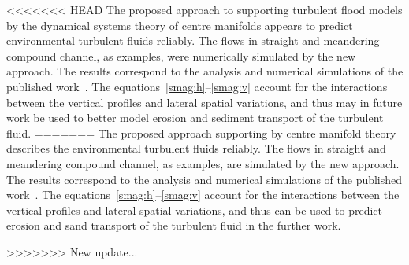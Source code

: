 \documentclass[twocolumn]{afmc_art}
\begin{document}
<<<<<<< HEAD
The proposed approach to supporting turbulent flood models by the dynamical systems theory of centre manifolds appears to predict environmental turbulent fluids reliably. 
The flows in straight and meandering compound channel, as examples, were numerically simulated by the new approach. 
The results correspond to the analysis and numerical simulations of the published work~\cite[e.g.]{Bousmar2002, Liu2009}.
The equations~\eqref{smag:h}--\eqref{smag:v} account for the interactions between the vertical profiles and lateral spatial variations, and thus may in future work be used to better model erosion and sediment transport of the turbulent fluid.
=======
The proposed approach supporting by centre manifold theory describes the environmental turbulent fluids reliably. 
The flows in straight and meandering compound channel, as examples, are simulated by the new approach. 
The results correspond to the analysis and numerical simulations of the published work~\cite[e.g.]{Bousmar2002,Liu2009,Sofialidis:1999fk}.
 The equations~\eqref{smag:h}--\eqref{smag:v} account for the interactions between the vertical profiles and lateral spatial variations, and thus can be used to predict erosion and sand transport of the turbulent fluid in the further work.

>>>>>>> New update...





\end{document}
